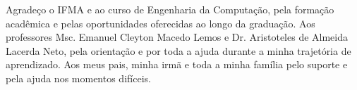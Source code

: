 

\begin{agradecimentos}

		Agradeço o IFMA e ao curso de Engenharia da Computação, pela formação acadêmica e pelas oportunidades oferecidas ao longo da graduação.
		Aos professores Msc. Emanuel Cleyton Macedo Lemos e Dr. Aristoteles de Almeida Lacerda Neto, pela orientação e por toda a ajuda durante a minha trajetória de aprendizado.
		Aos meus pais, minha irmã e toda a minha família pelo suporte e pela ajuda nos momentos difíceis.
		\vspace{\baselineskip}

\end{agradecimentos}




